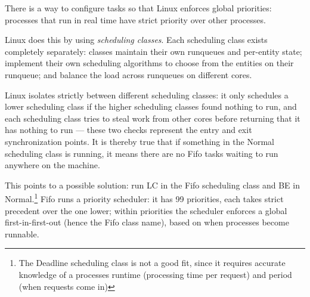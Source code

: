 There is a way to configure tasks so that Linux enforces global priorities:
processes that run in real time have strict priority over other processes.

Linux does this by using \textit{scheduling classes}. Each scheduling class
exists completely separately: classes maintain their own runqueues and
per-entity state; implement their own scheduling algorithms to choose from the
entities on their runqueue; and balance the load across runqueues on different
cores.

Linux isolates strictly between different scheduling classes: it only schedules
a lower scheduling class if the higher scheduling classes found nothing to run,
and each scheduling class tries to steal work from other cores before returning
that it has nothing to run --- these two checks represent the entry and exit
synchronization points. It is thereby true that if something in the Normal
scheduling class is running, it means there are no Fifo tasks waiting to run
anywhere on the machine.

This points to a possible solution: run LC in the Fifo scheduling class and BE
in Normal.\footnote{The Deadline scheduling class is not a good fit, since it
requires accurate knowledge of a processes runtime (processing time per request)
and period (when requests come in)} Fifo runs a priority scheduler: it has 99
priorities, each takes strict precedent over the one lower; within priorities
the scheduler enforces a global first-in-first-out (hence the Fifo class name),
based on when processes become runnable.

